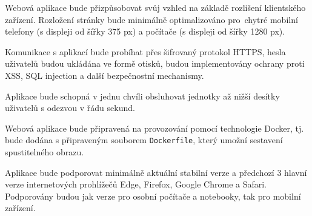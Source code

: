 \begin{enumerate}[label=\textcolor{decoration}{\textbf{N\arabic*}}, leftmargin=9mm]
    Webová aplikace bude přizpůsobovat svůj vzhled na základě rozlišení klientského zařízení. Rozložení stránky bude minimálně optimalizováno pro~chytré mobilní telefony (s displeji od šířky 375 px) a počítače (s displeji od šířky 1280 px).

    Komunikace s aplikací bude probíhat přes šifrovaný protokol HTTPS, hesla uživatelů budou ukládána ve formě otisků, budou implementovány ochrany proti XSS, SQL injection a další bezpečnostní mechanismy.

    Aplikace bude schopná v jednu chvíli obsluhovat jednotky až nižší desítky uživatelů s odezvou v řádu sekund.

    Webová aplikace bude připravená na provozování pomocí technologie Docker, tj. bude dodána s připraveným souborem \texttt{Dockerfile}, který umož\-ní sestavení spustitelného obrazu.

    Aplikace bude podporovat minimálně aktuální stabilní verze a předchozí 3 hlavní verze internetových prohlížečů Edge, Firefox, Google Chrome a Safari. Podporovány budou jak verze pro osobní počítače a notebooky, tak pro mobilní zařízení.
\end{enumerate}
